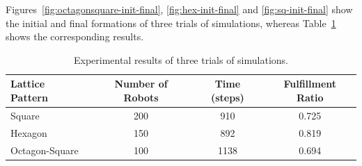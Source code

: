 Figures~\ref{fig:octagonsquare-init-final}, \ref{fig:hex-init-final} and \ref{fig:sq-init-final} show the initial and final formations of three trials of simulations, whereas Table~\ref{tab:mrf1-exp-data} shows the corresponding results.
%

\begin{table}
  \small\centering
  \caption{Experimental results of three trials of simulations.}
    \begin{tabular}{lccc} 
    \toprule 
    \textbf{Lattice Pattern} & \textbf{Number of Robots} & \textbf{Time (steps)} & \textbf{Fulfillment Ratio} \\
    \midrule
    Square & 200 & 910 & 0.725  \\ 
    \midrule
    Hexagon & 150 & 892 & 0.819 \\
    \midrule
    Octagon-Square & 100 & 1138 & 0.694 \\
    \bottomrule     
    \end{tabular}
    \label{tab:mrf1-exp-data}
\end{table}

